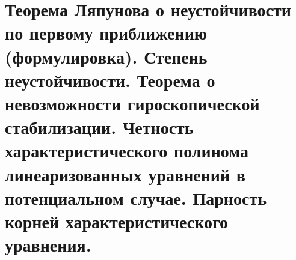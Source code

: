 \section{Теорема Ляпунова о неустойчивости по первому приближению (формулировка). Степень неустойчивости. Теорема о невозможности гироскопической стабилизации. Четность характеристического полинома линеаризованных уравнений в потенциальном случае. Парность корней характеристического уравнения.}\label{chasec9}



\newpage